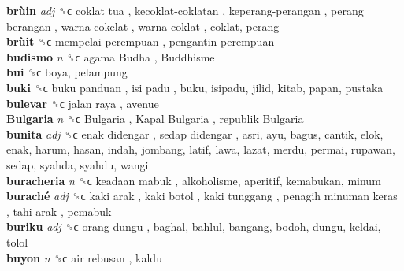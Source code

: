 \textbf{brùin} \emph{adj}  ␝ϲ   coklat tua ,  kecoklat-coklatan ,  keperang-perangan ,  perang berangan ,  warna cokelat ,  warna coklat , coklat, perang  \\
\textbf{brùit} ␝ϲ   mempelai perempuan ,  pengantin perempuan   \\
\textbf{budismo} \emph{n}  ␝ϲ   agama Budha ,  Buddhisme   \\
\textbf{bui} ␝ϲ  boya, pelampung  \\
\textbf{buki} ␝ϲ   buku panduan ,  isi padu , buku, isipadu, jilid, kitab, papan, pustaka  \\
\textbf{bulevar} ␝ϲ   jalan raya , avenue  \\
\textbf{Bulgaria} \emph{n}  ␝ϲ   Bulgaria ,  Kapal Bulgaria ,  republik Bulgaria   \\
\textbf{bunita} \emph{adj}  ␝ϲ   enak didengar ,  sedap didengar , asri, ayu, bagus, cantik, elok, enak, harum, hasan, indah, jombang, latif, lawa, lazat, merdu, permai, rupawan, sedap, syahda, syahdu, wangi  \\
\textbf{buracheria} \emph{n}  ␝ϲ   keadaan mabuk , alkoholisme, aperitif, kemabukan, minum  \\
\textbf{buraché} \emph{adj}  ␝ϲ   kaki arak ,  kaki botol ,  kaki tunggang ,  penagih minuman keras ,  tahi arak , pemabuk  \\
\textbf{buriku} \emph{adj}  ␝ϲ   orang dungu , baghal, bahlul, bangang, bodoh, dungu, keldai, tolol  \\
\textbf{buyon} \emph{n}  ␝ϲ   air rebusan , kaldu  \\
